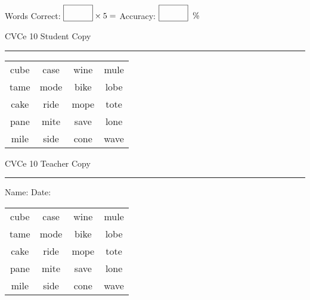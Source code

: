 \documentclass{memoir}
\begin{document}
\small

Words Correct: $\fbox{\phantom{\huge 100}} \times 5 = $ Accuracy: $\fbox{\phantom{\huge 100}}\;\; \%$ 

\vfill

\newpage


\footnotesize \noindent
CVCe 10 \hfill Student Copy
\smallskip
\hrule

\Large

\setlength{\tabcolsep}{14pt}
\def\arraystretch{2}

{\selectfont


\begin{vplace}[0.5]
\begin{center}
\begin{tabular}{cccc}
cube & case & wine & mule \\
tame & mode & bike & lobe \\
cake & ride & mope & tote \\
pane & mite & save & lone \\
mile & side & cone & wave \\
\end{tabular}
\end{center}
\end{vplace}

}

\newpage

\footnotesize \noindent
CVCe 10 \hfill Teacher Copy
\smallskip
\hrule

\small

\vfill

\noindent
Name: \underline{\hspace{1.75in}} \hfill Date: \underline{\hspace{1in}}

\Large

{\selectfont


\begin{vplace}[0.5]
\begin{center}
\begin{tabular}{cccc}
cube & case & wine & mule \\
tame & mode & bike & lobe \\
cake & ride & mope & tote \\
pane & mite & save & lone \\
mile & side & cone & wave \\
\end{tabular}
\end{center}
\end{vplace}



}
\end{document}
